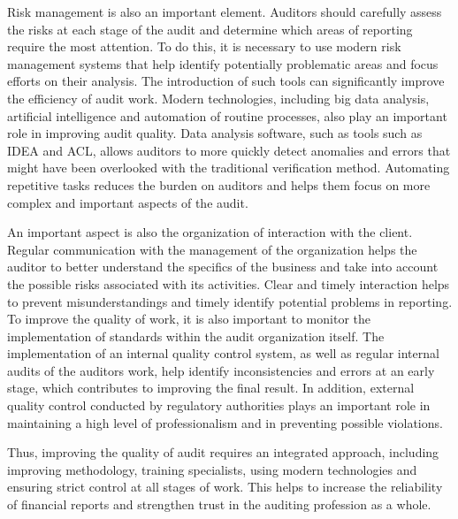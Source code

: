 \begin{multicols}{2}
Risk management is also an important element. Auditors should carefully
assess the risks at each stage of the audit and determine which areas of
reporting require the most attention. To do this, it is necessary to use
modern risk management systems that help identify potentially
problematic areas and focus efforts on their analysis. The introduction
of such tools can significantly improve the efficiency of audit work.
Modern technologies, including big data analysis, artificial
intelligence and automation of routine processes, also play an important
role in improving audit quality. Data analysis software, such as tools
such as IDEA and ACL, allows auditors to more quickly detect anomalies
and errors that might have been overlooked with the traditional
verification method. Automating repetitive tasks reduces the burden on
auditors and helps them focus on more complex and important aspects of
the audit.

An important aspect is also the organization of interaction with the
client. Regular communication with the management of the organization
helps the auditor to better understand the specifics of the business and
take into account the possible risks associated with its activities.
Clear and timely interaction helps to prevent misunderstandings and
timely identify potential problems in reporting. To improve the quality
of work, it is also important to monitor the implementation of standards
within the audit organization itself. The implementation of an internal
quality control system, as well as regular internal audits of the
auditors\textquotesingle{} work, help identify inconsistencies and
errors at an early stage, which contributes to improving the final
result. In addition, external quality control conducted by regulatory
authorities plays an important role in maintaining a high level of
professionalism and in preventing possible violations.

Thus, improving the quality of audit requires an integrated approach,
including improving methodology, training specialists, using modern
technologies and ensuring strict control at all stages of work. This
helps to increase the reliability of financial reports and strengthen
trust in the auditing profession as a whole.


\end{multicols}
